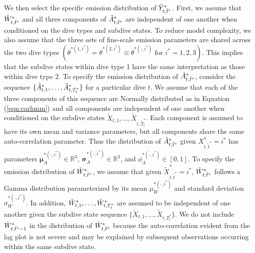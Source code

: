 We then select the specific emission distribution of $\tilde{Y}^*_{t,\tilde t^*}$. First, we assume that $\tilde{W}^*_{t,\tilde t^*}$ and all three components of $\tilde{A}^*_{t,\tilde t^*}$ are independent of one another when conditioned on the dive types and subdive states. To reduce model complexity, we also assume that the three sets of fine-scale emission parameters are shared across the two dive types $\left(\theta^{*(1,i^*)} = \theta^{*(2,i^*)} \equiv \theta^{*(\cdot,i^*)} \text{ for } i^* = 1,2,3\right)$. This implies that the subdive states within dive type 1 have the same interpretation as those within dive type 2.
To specify the emission distribution of $\tilde{A}^*_{t,\tilde t^*}$, consider the sequence $\{\tilde{A}^*_{t,1},\ldots,\tilde{A}^*_{t,T^*_t}\}$ for a particular dive $t$. We assume that each of the three components of this sequence are Normally distributed as in Equation (\ref{eqn:carhmm}) and all components are independent of one another when conditioned on the subdive states $\tilde X_{t,1},\ldots,\tilde X_{t,\tilde T^*_t}$. Each component is assumed to have its own mean and variance parameters, but all components share the same auto-correlation parameter. Thus the distribution of $\tilde{A}^*_{t,\tilde t^*}$ given $X^*_{t,\tilde t^*} = i^*$ has parameters $\mathbf{\mu}_A^{*(\cdot,i^*)} \in \mathbb{R}^3$, $\mathbf{\sigma}_A^{*(\cdot,i^*)} \in \mathbb{R}^3$, and $\phi_A^{*(\cdot,i^*)} \in [0,1]$.
To specify the emission distribution of $\tilde{W}^*_{t,\tilde t^*}$, we assume that given $\tilde X^*_{t,\tilde t^*} = i^*$, $\tilde{W}^*_{t,\tilde t^*}$ follows a Gamma distribution parameterized by its mean $\mu_W^{*(\cdot,i^*)}$ and standard deviation $\sigma_W^{*(\cdot,i^*)}$. In addition, $\tilde{W}^*_{t,1},\ldots,\tilde{W}^*_{t,T^*_t}$ are assumed to be independent of one another given the subdive state sequence $\big\{\tilde X_{t,1}, \ldots, \tilde X_{t,T_t^*}\big\}$. We do not include $\tilde{W}^*_{t,\tilde t^*-1}$ in the distribution of $\tilde{W}^*_{t,\tilde t^*}$ because the auto-correlation evident from the lag plot is not severe and may be explained by subsequent observations occurring within the same subdive state. 
%

